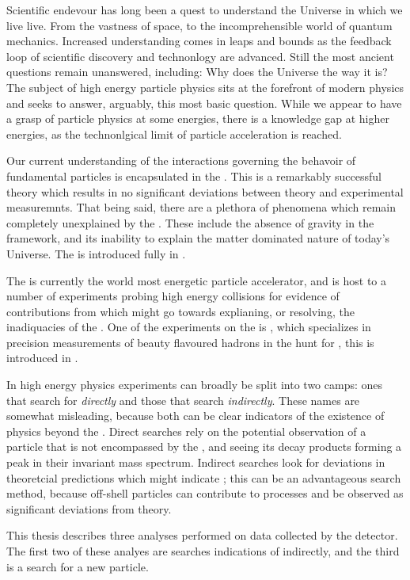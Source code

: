 Scientific endevour has long been a quest to understand the Universe in which we live live.
From the vastness of space, to the incomprehensible world of quantum mechanics.
Increased understanding comes in leaps and bounds as the feedback loop of scientific discovery and
technonlogy are advanced.
Still the most ancient questions remain unanswered, including: Why does the Universe the way it is?
The subject of high energy particle physics sits at the forefront of modern physics and seeks to
answer, arguably, this most basic question.
While we appear to have a grasp of particle physics at some energies, there is a knowledge gap at
higher energies, as the technonlgical limit of particle acceleration is reached.

Our current understanding of the interactions governing the behavoir of fundamental particles is
encapsulated in the \sm.
This is a remarkably successful theory which results in no significant deviations between theory
and experimental measuremnts.
That being said, there are a plethora of phenomena which remain completely unexplained by the \sm.
These include the absence of gravity in the \sm framework, and its inability to explain the matter
dominated nature of today's Universe.
The \sm is introduced fully in .

The \lhc is currently the world most energetic particle accelerator, and is host to a number of
experiments probing high energy collisions for evidence of contributions from \np which might go
towards explianing, or resolving, the inadiquacies of the \sm.
One of the experiments on the \lhc is \lhcb, which specializes in precision measurements of beauty
flavoured hadrons in the hunt for \np, this is introduced in .

In high energy physics experiments can broadly be split into two camps: ones that search for \np
\emph{directly} and those that search \emph{indirectly}.
These names are somewhat misleading, because both can be clear indicators of the existence of
physics beyond the \sm.
Direct searches rely on the potential observation of a particle that is not encompassed by the \sm,
and seeing its decay products forming a peak in their invariant mass spectrum.
Indirect searches look for deviations in theoretcial predictions which might indicate \np; this can
be an advantageous search method, because off-shell particles can contribute to processes and be
observed as significant deviations from theory.

This thesis describes three analyses performed on data collected by the \lhcb detector.
The first two of these analyes are searches indications of \np indirectly, and the third is a
search for a new particle.







%
%
%
